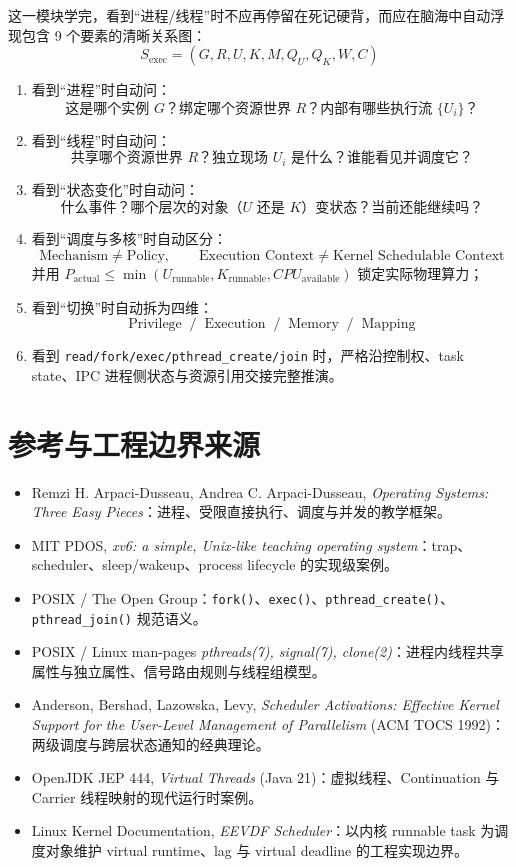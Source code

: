 \documentclass[11pt,a4paper]{ctexart}
\newcommand{\code}[1]{\texttt{#1}}
\begin{document}
\begin{corebox}[本专题终极心智模型]
这一模块学完，看到“进程/线程”时不应再停留在死记硬背，而应在脑海中自动浮现包含 9 个要素的清晰关系图：
\[
\boxed{
S_{\text{exec}} = (G, R, U, K, M, Q_U, Q_K, W, C)
}
\]

\begin{enumerate}
\item 看到“进程”时自动问：
  \[
  \boxed{\text{这是哪个实例 }G\text{？绑定哪个资源世界 }R\text{？内部有哪些执行流 }\{U_i\}\text{？}}
  \]
\item 看到“线程”时自动问：
  \[
  \boxed{\text{共享哪个资源世界 } R\text{？独立现场 } U_i \text{ 是什么？谁能看见并调度它？}}
  \]
\item 看到“状态变化”时自动问：
  \[
  \boxed{\text{什么事件？哪个层次的对象（}U\text{ 还是 }K\text{）变状态？当前还能继续吗？}}
  \]
\item 看到“调度与多核”时自动区分：
  \[
  \boxed{\text{Mechanism}\neq\text{Policy},\qquad \text{Execution Context}\neq\text{Kernel Schedulable Context}}
  \]
  并用 $P_{\text{actual}} \le \min(U_{\text{runnable}}, K_{\text{runnable}}, CPU_{\text{available}})$ 锁定实际物理算力；
\item 看到“切换”时自动拆为四维：
  \[
  \boxed{\text{Privilege} \;\; / \;\; \text{Execution} \;\; / \;\; \text{Memory} \;\; / \;\; \text{Mapping}}
  \]
\item 看到 \code{read/fork/exec/pthread\_create/join} 时，严格沿控制权、task state、IPC 进程侧状态与资源引用交接完整推演。
\end{enumerate}
\end{corebox}

\section*{参考与工程边界来源}
\begin{itemize}
\item Remzi H. Arpaci-Dusseau, Andrea C. Arpaci-Dusseau, \emph{Operating Systems: Three Easy Pieces}：进程、受限直接执行、调度与并发的教学框架。
\item MIT PDOS, \emph{xv6: a simple, Unix-like teaching operating system}：trap、scheduler、sleep/wakeup、process lifecycle 的实现级案例。
\item POSIX / The Open Group：\code{fork()}、\code{exec()}、\code{pthread\_create()}、\code{pthread\_join()} 规范语义。
\item POSIX / Linux man-pages \emph{pthreads(7), signal(7), clone(2)}：进程内线程共享属性与独立属性、信号路由规则与线程组模型。
\item Anderson, Bershad, Lazowska, Levy, \emph{Scheduler Activations: Effective Kernel Support for the User-Level Management of Parallelism} (ACM TOCS 1992)：两级调度与跨层状态通知的经典理论。
\item OpenJDK JEP 444, \emph{Virtual Threads} (Java 21)：虚拟线程、Continuation 与 Carrier 线程映射的现代运行时案例。
\item Linux Kernel Documentation, \emph{EEVDF Scheduler}：以内核 runnable task 为调度对象维护 virtual runtime、lag 与 virtual deadline 的工程实现边界。
\end{itemize}
\end{document}
